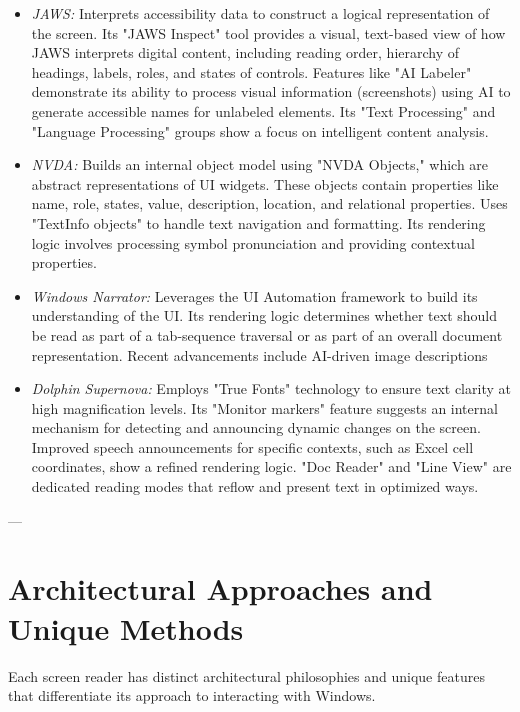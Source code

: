 \begin{itemize}
    \item \emph{JAWS:} Interprets accessibility data to construct a logical representation of the screen. Its "JAWS Inspect" tool provides a visual, text-based view of how JAWS interprets digital content, including reading order, hierarchy of headings, labels, roles, and states of controls.\cite{JAWSInspect} Features like "AI Labeler" demonstrate its ability to process visual information (screenshots) using AI to generate accessible names for unlabeled elements.\cite{JAWSAILabeler} Its "Text Processing" and "Language Processing" groups show a focus on intelligent content analysis.\cite{JAWSWhatsNew}
    \item \emph{NVDA:} Builds an internal object model using "NVDA Objects," which are abstract representations of UI widgets.\cite{AssistivLabsNVDAArch} These objects contain properties like name, role, states, value, description, location, and relational properties. Uses "TextInfo objects" to handle text navigation and formatting. Its rendering logic involves processing symbol pronunciation and providing contextual properties.\cite{NVDASpeech}
    \item \emph{Windows Narrator:} Leverages the UI Automation framework to build its understanding of the UI. Its rendering logic determines whether text should be read as part of a tab-sequence traversal or as part of an overall document representation.\cite{NarratorTechDetails} Recent advancements include AI-driven image descriptions\cite{NarratorImageDescriptions}
    \item \emph{Dolphin Supernova:} Employs "True Fonts" technology to ensure text clarity at high magnification levels.\cite{SuperNovaFeatures} Its "Monitor markers" feature suggests an internal mechanism for detecting and announcing dynamic changes on the screen. Improved speech announcements for specific contexts, such as Excel cell coordinates, show a refined rendering logic. "Doc Reader" and "Line View" are dedicated reading modes that reflow and present text in optimized ways.\cite{SuperNovaFeatures}
\end{itemize}

---

\section{Architectural Approaches and Unique Methods}
\label{sec:architectural-approaches}

Each screen reader has distinct architectural philosophies and unique features that differentiate its approach to interacting with Windows.

